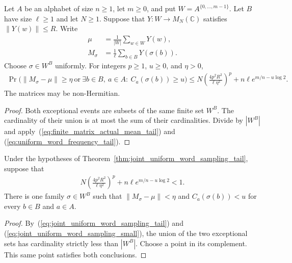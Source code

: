 \begin{theorem}
    \label{thm:joint_uniform_word_sampling_tail}
    \leanok
    Let $A$ be an alphabet of size $n\ge1$, let $m\ge0$, and put
    $W=A^{\{0,\ldots,m-1\}}$. Let $B$ have size $\ell\ge1$ and let $N\ge1$.
    Suppose that $Y:W\to M_N(\mathbb C)$ satisfies $\|Y(w)\|\le R$.
    Write
    \begin{align}
        \mu      & =\frac1{|W|}\sum_{w\in W}Y(w),        \\
        M_\sigma & =\frac1\ell\sum_{b\in B}Y(\sigma(b)).
        \label{eq:joint_uniform_word_sampling_mean}
    \end{align}
    Choose $\sigma\in W^B$ uniformly. For integers $p\ge1$, $u\ge0$,
    and $\eta>0$,
    \begin{align}
        \Pr\bigl(\|M_\sigma-\mu\|\ge\eta
        \ \text{or}\ \exists b\in B,\ a\in A:\ C_a(\sigma(b))\ge u\bigr)
        \le N\left(\frac{4p^2R^2}{\ell\eta^2}\right)^p
        +n\ell e^{m/n-u\log2}.
        \label{eq:joint_uniform_word_sampling_tail}
    \end{align}
    The matrices may be non-Hermitian.
\end{theorem}
\begin{proof}\leanok
    Both exceptional events are subsets of the same finite set $W^B$.
    The cardinality of their union is at most the sum of their cardinalities.
    Divide by $|W^B|$ and apply~(\ref{eq:finite_matrix_actual_mean_tail}) and
    (\ref{eq:uniform_word_frequency_tail}).
\end{proof}

\begin{theorem}
    \label{thm:joint_uniform_word_sampling_exists}
    \leanok
    Under the hypotheses of Theorem~\ref{thm:joint_uniform_word_sampling_tail},
    suppose that
    \begin{align}
        N\left(\frac{4p^2R^2}{\ell\eta^2}\right)^p
        +n\ell e^{m/n-u\log2}<1.
        \label{eq:joint_uniform_word_sampling_small}
    \end{align}
    There is one family $\sigma\in W^B$ such that
    $\|M_\sigma-\mu\|<\eta$ and $C_a(\sigma(b))<u$ for every $b\in B$ and $a\in A$.
\end{theorem}
\begin{proof}\leanok
    By~(\ref{eq:joint_uniform_word_sampling_tail}) and
    (\ref{eq:joint_uniform_word_sampling_small}), the union of the two
    exceptional sets has cardinality strictly less than $|W^B|$.
    Choose a point in its complement. This same point satisfies both conclusions.
\end{proof}
